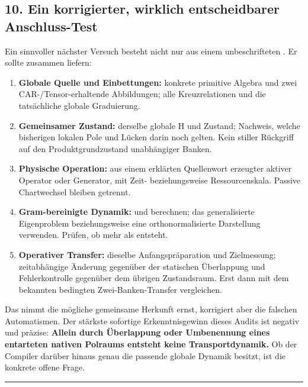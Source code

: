 \subsection{10. Ein korrigierter, wirklich entscheidbarer
Anschluss-Test}\label{ein-korrigierter-wirklich-entscheidbarer-anschluss-test}

Ein sinnvoller nächster Versuch besteht nicht nur aus einem
unbeschrifteten . Er sollte zusammen liefern:

\begin{enumerate}
\def\labelenumi{\arabic{enumi}.}
\tightlist
\item
  \textbf{Globale Quelle und Einbettungen:} konkrete primitive Algebra
  und zwei CAR-/Tensor-erhaltende Abbildungen; alle Kreuzrelationen und
  die tatsächliche globale Graduierung.
\item
  \textbf{Gemeinsamer Zustand:} derselbe globale H und Zustand;
  Nachweis, welche bisherigen lokalen Pole und Lücken darin noch gelten.
  Kein stiller Rückgriff auf den Produktgrundzustand unabhängiger
  Banken.
\item
  \textbf{Physische Operation:} aus einem erklärten Quellenwort
  erzeugter aktiver Operator oder Generator, mit Zeit- beziehungsweise
  Ressourcenskala. Passive Chartwechsel bleiben getrennt.
\item
  \textbf{Gram-bereinigte Dynamik:}  und
   berechnen; das generalisierte
  Eigenproblem beziehungsweise eine orthonormalisierte Darstellung
  verwenden. Prüfen, ob mehr als  entsteht.
\item
  \textbf{Operativer Transfer:} dieselbe Anfangspräparation und
  Zielmessung; zeitabhängige Änderung gegenüber der statischen
  Überlappung und Fehlerkontrolle gegenüber dem übrigen Zustandsraum.
  Erst dann mit dem bekannten bedingten Zwei-Banken-Transfer
  vergleichen.
\end{enumerate}

Das nimmt die mögliche gemeinsame Herkunft ernst, korrigiert aber die
falschen Automatismen. Der stärkste sofortige Erkenntnisgewinn dieses
Audits ist negativ und präzise: \textbf{Allein durch Überlappung oder
Umbenennung eines entarteten nativen Polraums entsteht keine
Transportdynamik.} Ob der Compiler darüber hinaus genau die passende
globale Dynamik besitzt, ist die konkrete offene Frage.

\begin{center}\rule{0.5\linewidth}{0.5pt}\end{center}

